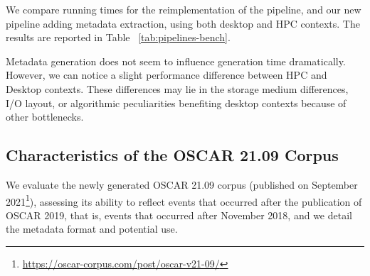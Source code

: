 \begin{table}[t]
    \centering\small
    \caption{Comparison of approximate generation times with and without metadata generation.}
    \label{tab:pipelines-bench}
\end{table}

We compare running times for the reimplementation of the \goclassy pipeline, and our new pipeline adding metadata extraction, using both desktop and HPC contexts. The results are reported in Table ~\ref{tab:pipelines-bench}.

Metadata generation does not seem to influence generation time dramatically. However, we can notice a slight performance difference between HPC and Desktop contexts. These differences may lie in the storage medium differences, I/O layout, or algorithmic peculiarities benefiting desktop contexts because of other bottlenecks.


\subsection{Characteristics of the OSCAR 21.09 Corpus}

We evaluate the newly generated OSCAR 21.09 corpus (published on September 2021\footnote{\url{https://oscar-corpus.com/post/oscar-v21-09/}}), assessing its ability to reflect events that occurred after the publication of OSCAR 2019, that is, events that occurred after November 2018, and we detail the metadata format and potential use.

